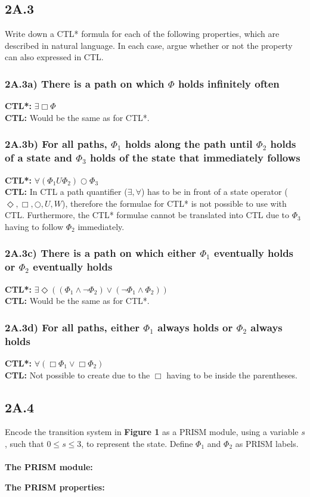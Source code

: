 \documentclass[12pt]{report}
\begin{document}
\subsection*{2A.3}
Write down a CTL* formula for each of the following properties, which are described in natural language. In each case, argue whether or not the property can also expressed in CTL.

\subsubsection*{2A.3a) There is a path on which $\Phi$ holds infinitely often}
	\textbf{CTL*:} $\exists \Box \Phi$\\
	\textbf{CTL:} Would be the same as for CTL*.

\subsubsection*{2A.3b) For all paths, $\Phi_1$ holds along the path until $\Phi_2$ holds of a state and $\Phi_3$ holds of the state that immediately follows}
	\textbf{CTL*:} $\forall (\Phi_1 U \Phi_2) \bigcirc \Phi_3$\\
	\textbf{CTL:} In CTL a path quantifier ($\exists, \forall$) has to be in front of a state operator ($\Diamond, \Box, \bigcirc, U, W$), therefore the formulae for CTL* is not possible to use with CTL. Furthermore, the CTL* formulae cannot be translated into CTL due to $\Phi_3$ having to follow $\Phi_2$ immediately. 

\subsubsection*{2A.3c) There is a path on which either $\Phi_1$ eventually holds or $\Phi_2$ eventually holds}
	\textbf{CTL*:} $\exists \Diamond \left((\Phi_1 \wedge \neg\Phi_2) \vee (\neg\Phi_1 \wedge \Phi_2)\right)$\\
	\textbf{CTL:} Would be the same as for CTL*.

\subsubsection*{2A.3d) For all paths, either $\Phi_1$ always holds or $\Phi_2$ always holds}
	\textbf{CTL*:} $\forall(\Box \Phi_1 \vee \Box \Phi_2)$\\
	\textbf{CTL:} Not possible to create due to the $\Box$ having to be inside the parentheses.

\newpage
\subsection*{2A.4}
Encode the transition system in \textbf{Figure 1} as a PRISM module, using a variable $s$, such that $0 \leq s \leq 3$, to represent the state. Define $\Phi_1$ and $\Phi_2$ as PRISM labels.\\
\\
\textbf{The PRISM module:}

\textbf{The PRISM properties:}

\end{document}
